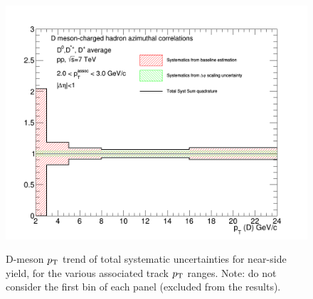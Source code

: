 \begin{figure}[!htbp]
{\includegraphics[width=0.48\linewidth, height=0.33\linewidth]{figures/FitOutput/TotalSystematicSourcesNSYield_pthad2to3.png}}
\caption{D-meson $p_{\rm T}$ trend of total systematic uncertainties for near-side yield, for the various associated track $p_{\rm T}$ ranges. Note: do not consider the first bin of each panel (excluded from the results).}
\label{fig:NSyield}
\end{figure}
